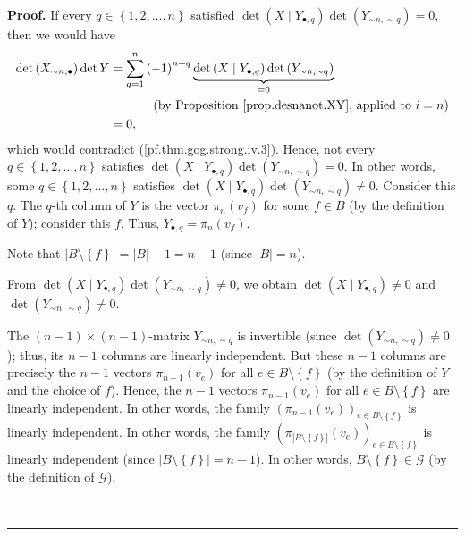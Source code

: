 \documentclass[numbers=enddot,12pt,final,onecolumn,notitlepage]{scrartcl}%
\theoremstyle{definition}
\newenvironment{proof}[1][Proof]{\noindent\textbf{#1.} }{\ \rule{0.5em}{0.5em}}
\let\sumnonlimits\sum
\renewcommand{\sum}{\sumnonlimits\limits}
\theoremstyle{plainsl}
\begin{document}
\begin{proof}
If every $q\in\left\{  1,2,\ldots,n\right\}  $ satisfied $\det\left(  X\mid
Y_{\bullet,q}\right)  \det\left(  Y_{\sim n,\sim q}\right)  =0$, then we would
have%
\begin{align*}
\det\left(  X_{\sim n,\bullet}\right)  \det Y  &  =\sum_{q=1}^{n}\left(
-1\right)  ^{n+q}\underbrace{\det\left(  X\mid Y_{\bullet,q}\right)
\det\left(  Y_{\sim n,\sim q}\right)  }_{=0}\\
&  \ \ \ \ \ \ \ \ \ \ \left(  \text{by Proposition \ref{prop.desnanot.XY},
applied to }i=n\right) \\
&  =0,
\end{align*}
which would contradict (\ref{pf.thm.gog.strong.iv.3}). Hence, not every
$q\in\left\{  1,2,\ldots,n\right\}  $ satisfies \newline$\det\left(  X\mid
Y_{\bullet,q}\right)  \det\left(  Y_{\sim n,\sim q}\right)  =0$. In other
words, some $q\in\left\{  1,2,\ldots,n\right\}  $ satisfies $\det\left(  X\mid
Y_{\bullet,q}\right)  \det\left(  Y_{\sim n,\sim q}\right)  \neq0$. Consider
this $q$. The $q$-th column of $Y$ is the vector $\pi_{n}\left(  v_{f}\right)
$ for some $f\in B$ (by the definition of $Y$); consider this $f$. Thus,
$Y_{\bullet,q}=\pi_{n}\left(  v_{f}\right)  $.

Note that $\left\vert B\setminus\left\{  f\right\}  \right\vert =\left\vert
B\right\vert -1=n-1$ (since $\left\vert B\right\vert =n$).

From $\det\left(  X\mid Y_{\bullet,q}\right)  \det\left(  Y_{\sim n,\sim
q}\right)  \neq0$, we obtain $\det\left(  X\mid Y_{\bullet,q}\right)  \neq0$
and $\det\left(  Y_{\sim n,\sim q}\right)  \neq0$.

The $\left(  n-1\right)  \times\left(  n-1\right)  $-matrix $Y_{\sim n,\sim
q}$ is invertible (since $\det\left(  Y_{\sim n,\sim q}\right)  \neq0$); thus,
its $n-1$ columns are linearly independent. But these $n-1$ columns are
precisely the $n-1$ vectors $\pi_{n-1}\left(  v_{e}\right)  $ for all $e\in
B\setminus\left\{  f\right\}  $ (by the definition of $Y$ and the choice of
$f$). Hence, the $n-1$ vectors $\pi_{n-1}\left(  v_{e}\right)  $ for all $e\in
B\setminus\left\{  f\right\}  $ are linearly independent. In other words, the
family $\left(  \pi_{n-1}\left(  v_{e}\right)  \right)  _{e\in B\setminus
\left\{  f\right\}  }$ is linearly independent. In other words, the family
$\left(  \pi_{\left\vert B\setminus\left\{  f\right\}  \right\vert }\left(
v_{e}\right)  \right)  _{e\in B\setminus\left\{  f\right\}  }$ is linearly
independent (since $\left\vert B\setminus\left\{  f\right\}  \right\vert
=n-1$). In other words, $B\setminus\left\{  f\right\}  \in\mathcal{G}$ (by the
definition of $\mathcal{G}$).


\end{proof}
\end{document}
